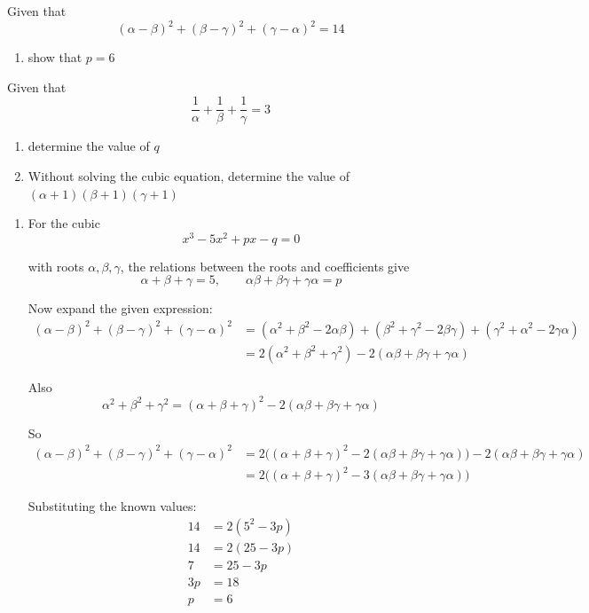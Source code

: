 \documentclass[leqno]{article}
\begin{document}
\begin{enumerate}[
  label=\textbf{\arabic*.},
  leftmargin=*,
  topsep=0pt,
  partopsep=0pt,
  parsep=0pt
]
Given that
\[
(\alpha-\beta)^2 + (\beta-\gamma)^2 + (\gamma-\alpha)^2 = 14
\]
\begin{enumerate}[label=\textbf{(\alph*)}]
  \item show that $p=6$  \\
\end{enumerate}
Given that
\[
\frac{1}{\alpha} + \frac{1}{\beta} + \frac{1}{\gamma} = 3
\]
\begin{enumerate}[label=\textbf{(\alph*)}, resume]
  \item determine the value of $q$  \\
  \item Without solving the cubic equation, determine the value of $(\alpha+1)(\beta+1)(\gamma+1)$  \\
\end{enumerate}

\vspace*{10pt}

\begin{djsSolution}
\begin{enumerate}[label=\textbf{(\alph*)}]
  \item For the cubic
  \[
  x^3-5x^2+px-q=0
  \]

  with roots $\alpha,\beta,\gamma$, the relations between the roots and coefficients give
  \[
  \alpha+\beta+\gamma=5,
  \qquad
  \alpha\beta+\beta\gamma+\gamma\alpha=p
  \]

  Now expand the given expression:
  \begin{align*}
  (\alpha-\beta)^2+(\beta-\gamma)^2+(\gamma-\alpha)^2
  &= (\alpha^2+\beta^2-2\alpha\beta)+(\beta^2+\gamma^2-2\beta\gamma)+(\gamma^2+\alpha^2-2\gamma\alpha) \\
  &= 2(\alpha^2+\beta^2+\gamma^2)-2(\alpha\beta+\beta\gamma+\gamma\alpha)
  \end{align*}

  Also
  \[
  \alpha^2+\beta^2+\gamma^2=(\alpha+\beta+\gamma)^2-2(\alpha\beta+\beta\gamma+\gamma\alpha)
  \]

  So
  \begin{align*}
  (\alpha-\beta)^2+(\beta-\gamma)^2+(\gamma-\alpha)^2
  &=2\big((\alpha+\beta+\gamma)^2-2(\alpha\beta+\beta\gamma+\gamma\alpha)\big)-2(\alpha\beta+\beta\gamma+\gamma\alpha) \\
  &=2\big((\alpha+\beta+\gamma)^2-3(\alpha\beta+\beta\gamma+\gamma\alpha)\big)
  \end{align*}

  Substituting the known values:
  \begin{align*}
  14&=2(5^2-3p) \\
  14&=2(25-3p) \\
  7&=25-3p \\
  3p&=18 \\
  p&=6
  \end{align*}


\end{enumerate}
\end{djsSolution}
\end{enumerate}
\end{document}
